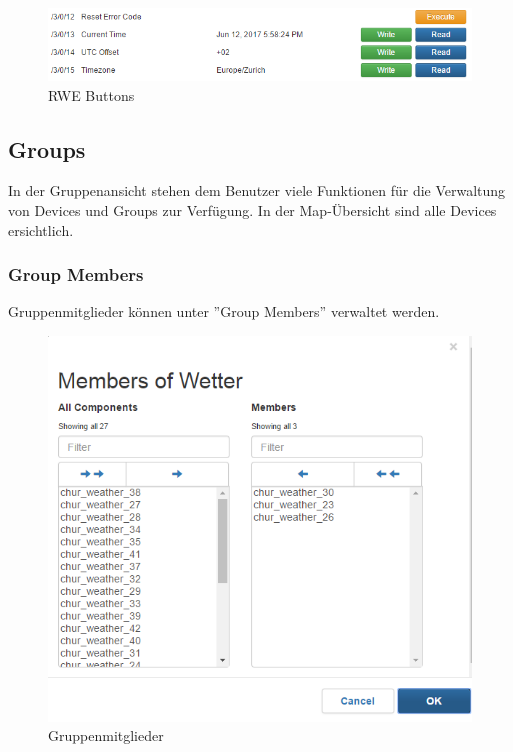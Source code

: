 \begin{figure}[H]
\centering
\includegraphics[scale=0.7]{../04_Realisierung/images/userinterface/rwe.png}
\caption{RWE Buttons}
\end{figure}

\subsection{Groups}
In der Gruppenansicht stehen dem Benutzer viele Funktionen für die Verwaltung von Devices und Groups zur Verfügung. In der Map-Übersicht sind alle Devices ersichtlich.

\subsubsection{Group Members}
Gruppenmitglieder können unter ''Group Members'' verwaltet werden. 

\begin{figure}[H]
\centering
\includegraphics[scale=0.8]{../04_Realisierung/images/userinterface/groupmembers.png}
\caption{Gruppenmitglieder}
\end{figure}

